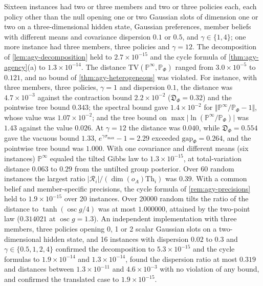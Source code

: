 \begin{numcheck}\label{chk:agy-heterogeneous}
Sixteen instances had two or three members and two or three policies each, each policy other than the null opening one or two Gaussian slots of dimension one or two on a three-dimensional hidden state, Gaussian preferences, member beliefs with different means and covariance dispersion $0.1$ or $0.5$, and $\gamma\in\{1,4\}$; one more instance had three members, three policies and $\gamma=12$. The decomposition of \cref{lem:agy-decomposition} held to $2.7\times10^{-15}$ and the cycle formula of \cref{thm:agy-agency}(a) to $1.3\times10^{-14}$. The distance $\mathrm{TV}(\mathbb P^\infty,\mathbb P_\Phi)$ ranged from $3.0\times10^{-5}$ to $0.121$, and no bound of \cref{thm:agy-heterogeneous} was violated. For instance, with three members, three policies, $\gamma=1$ and dispersion $0.1$, the distance was $4.7\times10^{-3}$ against the contraction bound $2.2\times10^{-2}$ ($\mathfrak D_\Phi=0.32$) and the pointwise tree bound $0.343$; the spectral bound gave $1.4\times10^{-2}$ for $\Vert\mathbb P^\infty/\mathbb P_\Phi-1\Vert$, whose value was $1.07\times10^{-2}$; and the tree bound on $\max\lvert\ln(\mathbb P^\infty/\mathbb P_\Phi)\rvert$ was $1.43$ against the value $0.026$. At $\gamma=12$ the distance was $0.040$, while $\mathfrak D_\Phi=0.554$ gave the vacuous bound $1.33$, $e^{\gamma\sigma_{\max}}-1=2.29$ exceeded $\mathrm{gap}_\Phi=0.264$, and the pointwise tree bound was $1.000$. With one covariance and different means (six instances) $\mathbb P^\infty$ equaled the tilted Gibbs law to $1.3\times10^{-15}$, at total-variation distance $0.063$ to $0.29$ from the untilted group posterior. Over 60 random instances the largest ratio $\lvert\mathcal R_i\rvert/(\dim(o_A)\mathrm{Th}_i)$ was $0.39$. With a common belief and member-specific precisions, the cycle formula of \cref{rem:agy-precisions} held to $1.9\times10^{-15}$ over 20 instances. Over 20000 random tilts the ratio of the distance to $\tanh(\operatorname{osc}g/4)$ was at most $1.000000$, attained by the two-point law ($0.314021$ at $\operatorname{osc}g=1.3$). An independent implementation with three members, three policies opening 0, 1 or 2 scalar Gaussian slots on a two-dimensional hidden state, and 16 instances with dispersion $0.02$ to $0.3$ and $\gamma\in\{0.5,1,2,4\}$ confirmed the decomposition to $5.3\times10^{-15}$ and the cycle formulas to $1.9\times10^{-14}$ and $1.3\times10^{-14}$, found the dispersion ratio at most $0.319$ and distances between $1.3\times10^{-11}$ and $4.6\times10^{-3}$ with no violation of any bound, and confirmed the translated case to $1.9\times10^{-15}$.
\end{numcheck}

